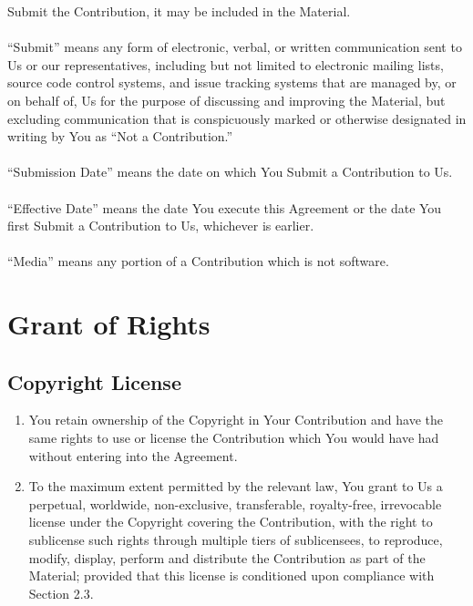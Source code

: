 \documentclass{article}
\begin{document}
Submit the Contribution, it may be included in the Material.
\\
\\
\noindent
``Submit'' means any form of electronic, verbal, or written communication sent
to Us or our representatives, including but not limited to electronic mailing
lists, source code control systems, and issue tracking systems that are managed
by, or on behalf of, Us for the purpose of discussing and improving the
Material, but excluding communication that is conspicuously marked or otherwise
designated in writing by You as ``Not a Contribution.''
\\
\\
\noindent
``Submission Date'' means the date on which You Submit a Contribution to Us.
\\
\\
\noindent
``Effective Date'' means the date You execute this Agreement or the date You
first Submit a Contribution to Us, whichever is earlier.
\\
\\
\noindent
``Media'' means any portion of a Contribution which is not software.


\section{Grant of Rights}

\subsection{Copyright License}

\begin{enumerate}
\item You retain ownership of the Copyright in Your Contribution and have the
same rights to use or license the Contribution which You would have had without
entering into the Agreement.
\item To the maximum extent permitted by the relevant law, You grant to Us a
perpetual, worldwide, non-exclusive, transferable, royalty-free, irrevocable
license under the Copyright covering the Contribution, with the right to
sublicense such rights through multiple tiers of sublicensees, to reproduce,
modify, display, perform and distribute the Contribution as part of the
Material; provided that this license is conditioned upon compliance with
Section 2.3.
\end{enumerate}
\end{document}
